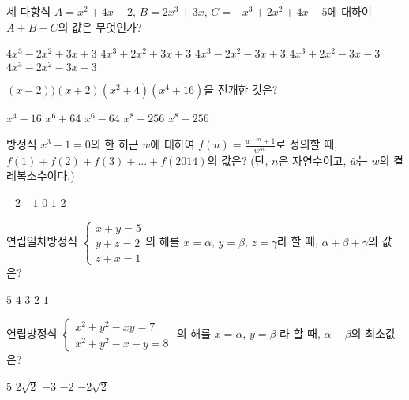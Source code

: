 \documentclass[11pt]{exam}
\begin{document}
%
%
\begin{questions}
	
\addpoints
\question[3] 세 다항식 $A=x^2+4x-2$, $B=2x^3+3x$, $C=-x^3+2x^2+4x-5$에 대하여 $A+B-C$의 값은 무엇인가? 

\begin{choices}
	\choice $4x^3-2x^2+3x+3$
	\choice $4x^3+2x^2+3x+3$
	\choice $4x^3-2x^2-3x+3$
	\choice $4x^3+2x^2-3x-3$
	\choice $4x^3-2x^2-3x-3$
\end{choices}
\vspace{1.0in}

\addpoints
\question[4] $(x-2))(x+2)(x^2+4)(x^4+16)$을 전개한 것은?
\begin{choices}
	\choice $x^4-16$
	\choice $x^6+64$
	\choice $x^6-64$
	\choice $x^8+256$
	\choice $x^8-256$
\end{choices}
\vspace{1.0in}

\addpoints
\question[5] 방정식 $x^3-1=0$의 한 허근 $w$에 대하여 $f(n) = \frac{w^{-4n} + 1}{w^{4n}}$로 정의할 때, $f(1) + f(2) + f(3)+...+f(2014)$의 값은? (단, $n$은 자연수이고, $\bar{w}$는 $w$의 켤레복소수이다.)
\begin{choices}
	\choice $-2$
	\choice $-1$
	\choice $0$
	\choice $1$
	\choice $2$
\end{choices}
\vspace{1.0in}

\addpoints
\question[4] 연립일차방정식 $\begin{cases}x+y=5 \\y+z=2 \\ z+x=1 \end{cases} $의 해를 $x=\alpha$, $y=\beta$, $z=\gamma$라 할 때, $\alpha + \beta + \gamma$의 값은?
\begin{choices}
	\choice $5$
	\choice $4$
	\choice $3$
	\choice $2$
	\choice $1$
\end{choices}
\vspace{1.0in}

\addpoints
\question[5] 연립방정식 $\begin{cases}x^2+y^2-xy=7 \\x^2+y^2-x-y=8 \end{cases}$ 의 해를 $x=\alpha$, $y=\beta$ 라 할 때, $\alpha-\beta$의 최소값은?
\begin{choices}
	\choice $5$
	\choice $2\sqrt{2}$
	\choice $-3$
	\choice $-2$
	\choice $-2\sqrt{2}$
\end{choices}


\end{questions}
\end{document}
